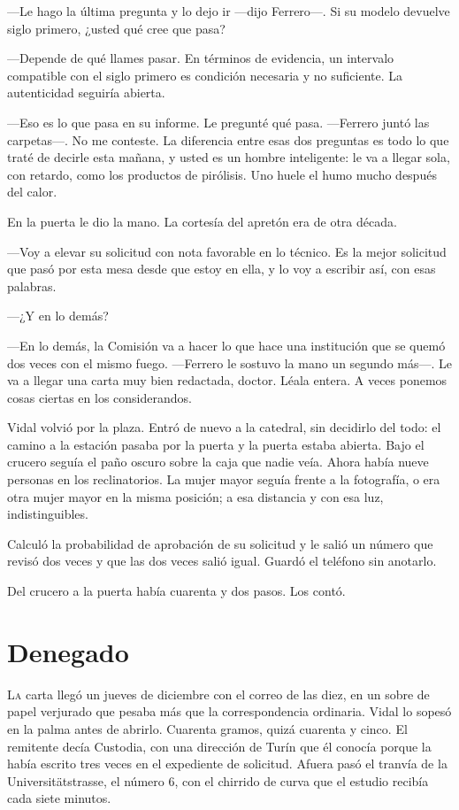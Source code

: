 ---Le hago la última pregunta y lo dejo ir ---dijo Ferrero---. Si su modelo devuelve siglo primero, ¿usted qué cree que pasa?

---Depende de qué llames pasar. En términos de evidencia, un intervalo compatible con el siglo primero es condición necesaria y no suficiente. La autenticidad seguiría abierta.

---Eso es lo que pasa en su informe. Le pregunté qué pasa. ---Ferrero juntó las carpetas---. No me conteste. La diferencia entre esas dos preguntas es todo lo que traté de decirle esta mañana, y usted es un hombre inteligente: le va a llegar sola, con retardo, como los productos de pirólisis. Uno huele el humo mucho después del calor.

En la puerta le dio la mano. La cortesía del apretón era de otra década.

---Voy a elevar su solicitud con nota favorable en lo técnico. Es la mejor solicitud que pasó por esta mesa desde que estoy en ella, y lo voy a escribir así, con esas palabras.

---¿Y en lo demás?

---En lo demás, la Comisión va a hacer lo que hace una institución que se quemó dos veces con el mismo fuego. ---Ferrero le sostuvo la mano un segundo más---. Le va a llegar una carta muy bien redactada, doctor. Léala entera. A veces ponemos cosas ciertas en los considerandos.

Vidal volvió por la plaza. Entró de nuevo a la catedral, sin decidirlo del todo: el camino a la estación pasaba por la puerta y la puerta estaba abierta. Bajo el crucero seguía el paño oscuro sobre la caja que nadie veía. Ahora había nueve personas en los reclinatorios. La mujer mayor seguía frente a la fotografía, o era otra mujer mayor en la misma posición; a esa distancia y con esa luz, indistinguibles.

Calculó la probabilidad de aprobación de su solicitud y le salió un número que revisó dos veces y que las dos veces salió igual. Guardó el teléfono sin anotarlo.

Del crucero a la puerta había cuarenta y dos pasos. Los contó.

\clearpage

\chapter{Denegado}

\lettrine[lines=2, lhang=0.1, nindent=0.2em]{L}{a} carta llegó un jueves de diciembre con el correo de las diez, en un sobre de papel verjurado que pesaba más que la correspondencia ordinaria. Vidal lo sopesó en la palma antes de abrirlo. Cuarenta gramos, quizá cuarenta y cinco. El remitente decía Custodia, con una dirección de Turín que él conocía porque la había escrito tres veces en el expediente de solicitud. Afuera pasó el tranvía de la Universitätstrasse, el número 6, con el chirrido de curva que el estudio recibía cada siete minutos.



